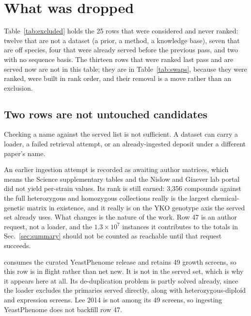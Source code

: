 
\section{What was dropped}\label{sec:excluded}



Table~\ref{tab:excluded} holds the 25 rows that were considered and never ranked: twelve
that are not a dataset (a prior, a method, a knowledge base), seven that are off species,
four that were already served before the previous pass, and two with no sequence basis.
The thirteen rows that were ranked last pass and are served now are not in this table;
they are in Table~\ref{tab:swaps}, because they were ranked, were built in rank order, and
their removal is a move rather than an exclusion.

\subsection{Two rows are not untouched candidates}\label{sec:status}

Checking a name against the served list is not sufficient. A dataset can carry a loader, a
failed retrieval attempt, or an already-ingested deposit under a different paper's name.

 An earlier ingestion attempt
is recorded as awaiting author matrices, which means the Science supplementary tables and
the Nislow and Giaever lab portal did not yield per-strain values. Its rank is still
earned: 3,356 compounds against the full heterozygous and homozygous collections really is
the largest chemical-genetic matrix in existence, and it really is on the YKO genotype axis
the served set already uses. What changes is the nature of the work. Row 47 is an author
request, not a loader, and the $1.3\times10^7$ instances it contributes to the totals in
Sec.~\ref{sec:summary} should not be counted as reachable until that request succeeds.

 consumes the curated YeastPhenome
release and retains 49 growth screens, so this row is in flight rather than net new. It is
not in the served set, which is why it appears here at all. Its de-duplication problem is
partly solved already, since the loader excludes the primaries served directly, along with
heterozygous-diploid and expression screens. Lee 2014 is not among its 49 screens, so
ingesting YeastPhenome does not backfill row 47.

